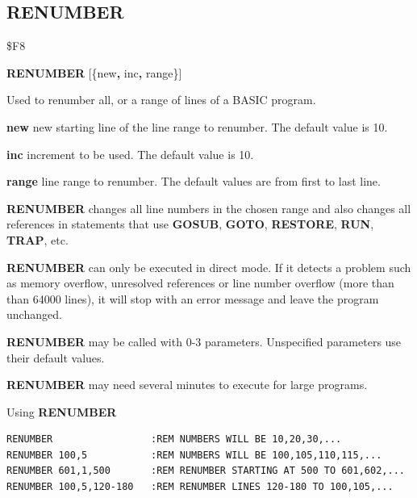 \subsection{RENUMBER}
\begin{description}[leftmargin=2cm,style=nextline]
\item [Token:] \$F8
\item [Format:] {\bf RENUMBER} [\{new{\bf,} inc{\bf,} range\}]
\item [Usage:] Used to renumber all, or
               a range of lines of a BASIC program.

               {\bf new } new starting line of the
               line range to renumber.
               The default value is 10.

               {\bf inc } increment to be used.
               The default value is 10.

               {\bf range } line range to renumber.
               The default values are from first to last line.

               {\bf RENUMBER} changes all line numbers in
               the chosen range and also changes all references
               in statements that use {\bf GOSUB}, {\bf GOTO},
               {\bf RESTORE}, {\bf RUN}, {\bf TRAP}, etc.

               {\bf RENUMBER} can only be executed in direct mode.
               If it detects a problem such as memory overflow,
               unresolved references or line number overflow
               (more than than 64000 lines), it will stop with an error
               message and leave the program unchanged.

               {\bf RENUMBER} may be called with 0-3 parameters.
               Unspecified parameters use their default values.

\item [Remarks:] {\bf RENUMBER} may need several
                 minutes to execute for large programs.

\item [Examples:] Using {\bf RENUMBER}
\begin{tcolorbox}[colback=black,coltext=white]
\verbatimfont{\codefont}
\begin{verbatim}
RENUMBER                 :REM NUMBERS WILL BE 10,20,30,...
RENUMBER 100,5           :REM NUMBERS WILL BE 100,105,110,115,...
RENUMBER 601,1,500       :REM RENUMBER STARTING AT 500 TO 601,602,...
RENUMBER 100,5,120-180   :REM RENUMBER LINES 120-180 TO 100,105,...
\end{verbatim}
\end{tcolorbox}
\end{description}

